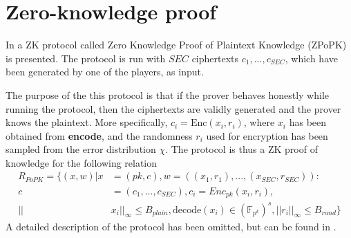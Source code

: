 \documentclass[../main.tex]{subfiles}
\begin{document}
\section{Zero-knowledge proof} \label{sec:zkpopk-theory}
    In \cite{damgaard2012multiparty} a ZK protocol called Zero Knowledge Proof of Plaintext Knowledge (ZPoPK) is presented.
    The protocol is run with $SEC$ ciphertexts $c_1, ..., c_{SEC}$, which have been generated by one of the players, as input.

    The purpose of the this protocol is that if the prover behaves honestly while running the protocol, then the ciphertexts are validly generated and the prover knows the plaintext.
    More specifically, $c_i = \text{Enc}(x_i, r_i)$, where $x_i$ has been obtained from \textbf{encode}, and the randomness $r_i$ used for encryption has been sampled from the error distribution $\chi$.
    The protocol is thus a ZK proof of knowledge for the following relation
    \begin{align*}
        R_{PoPK} = \{ (x, w) | x &= (pk, c), w = ((x_1, r_1), ..., (x_{SEC}, r_{SEC})): \\
        c &= (c_1, ..., c_{SEC}), c_i = Enc_{pk}(x_i, r_i), \\
        ||&x_i||_\infty \leq B_{plain}, \text{decode}(x_i) \in (\mathbb{F}_{p^k})^s, ||r_i||_\infty \leq B_{rand}\}
    \end{align*}
    A detailed description of the protocol has been omitted, but can be found in \cite{damgaard2012multiparty}.
\end{document}
